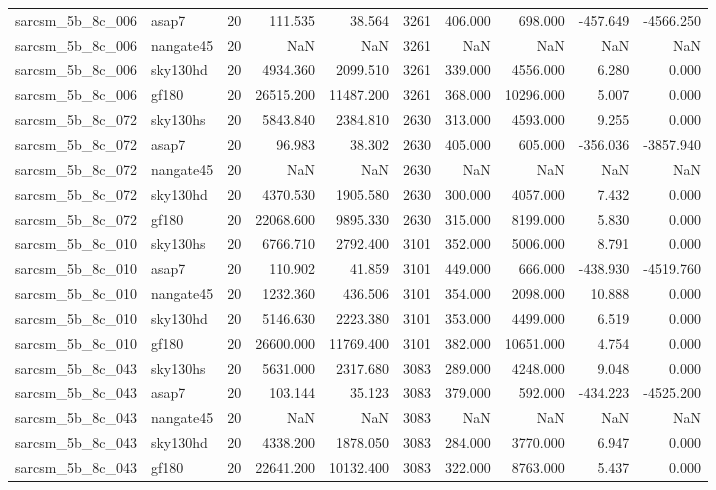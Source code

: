 \documentclass{article}
\begin{document}
\begin{longtable}{llrrrrrrrr}
sarcsm\_5b\_8c\_006 & asap7 & 20 & 111.535 & 38.564 & 3261 & 406.000 & 698.000 & -457.649 & -4566.250 \\
sarcsm\_5b\_8c\_006 & nangate45 & 20 & NaN & NaN & 3261 & NaN & NaN & NaN & NaN \\
sarcsm\_5b\_8c\_006 & sky130hd & 20 & 4934.360 & 2099.510 & 3261 & 339.000 & 4556.000 & 6.280 & 0.000 \\
sarcsm\_5b\_8c\_006 & gf180 & 20 & 26515.200 & 11487.200 & 3261 & 368.000 & 10296.000 & 5.007 & 0.000 \\
sarcsm\_5b\_8c\_072 & sky130hs & 20 & 5843.840 & 2384.810 & 2630 & 313.000 & 4593.000 & 9.255 & 0.000 \\
sarcsm\_5b\_8c\_072 & asap7 & 20 & 96.983 & 38.302 & 2630 & 405.000 & 605.000 & -356.036 & -3857.940 \\
sarcsm\_5b\_8c\_072 & nangate45 & 20 & NaN & NaN & 2630 & NaN & NaN & NaN & NaN \\
sarcsm\_5b\_8c\_072 & sky130hd & 20 & 4370.530 & 1905.580 & 2630 & 300.000 & 4057.000 & 7.432 & 0.000 \\
sarcsm\_5b\_8c\_072 & gf180 & 20 & 22068.600 & 9895.330 & 2630 & 315.000 & 8199.000 & 5.830 & 0.000 \\
sarcsm\_5b\_8c\_010 & sky130hs & 20 & 6766.710 & 2792.400 & 3101 & 352.000 & 5006.000 & 8.791 & 0.000 \\
sarcsm\_5b\_8c\_010 & asap7 & 20 & 110.902 & 41.859 & 3101 & 449.000 & 666.000 & -438.930 & -4519.760 \\
sarcsm\_5b\_8c\_010 & nangate45 & 20 & 1232.360 & 436.506 & 3101 & 354.000 & 2098.000 & 10.888 & 0.000 \\
sarcsm\_5b\_8c\_010 & sky130hd & 20 & 5146.630 & 2223.380 & 3101 & 353.000 & 4499.000 & 6.519 & 0.000 \\
sarcsm\_5b\_8c\_010 & gf180 & 20 & 26600.000 & 11769.400 & 3101 & 382.000 & 10651.000 & 4.754 & 0.000 \\
sarcsm\_5b\_8c\_043 & sky130hs & 20 & 5631.000 & 2317.680 & 3083 & 289.000 & 4248.000 & 9.048 & 0.000 \\
sarcsm\_5b\_8c\_043 & asap7 & 20 & 103.144 & 35.123 & 3083 & 379.000 & 592.000 & -434.223 & -4525.200 \\
sarcsm\_5b\_8c\_043 & nangate45 & 20 & NaN & NaN & 3083 & NaN & NaN & NaN & NaN \\
sarcsm\_5b\_8c\_043 & sky130hd & 20 & 4338.200 & 1878.050 & 3083 & 284.000 & 3770.000 & 6.947 & 0.000 \\
sarcsm\_5b\_8c\_043 & gf180 & 20 & 22641.200 & 10132.400 & 3083 & 322.000 & 8763.000 & 5.437 & 0.000 \\

\end{longtable}
\end{document}
